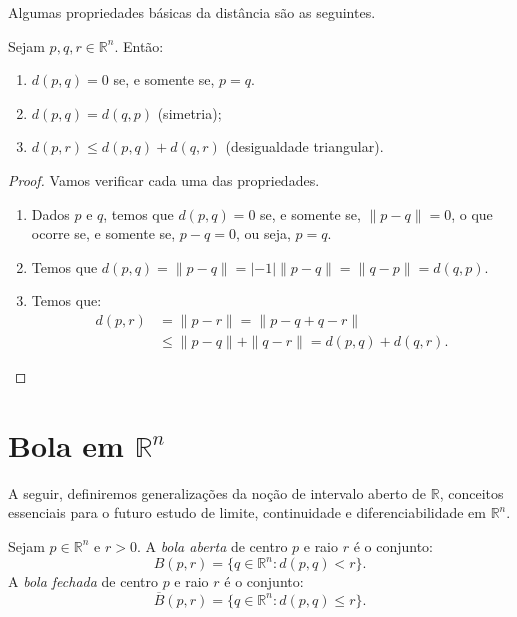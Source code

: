 Algumas propriedades básicas da distância são as seguintes.
\begin{proposition}
    Sejam $p, q, r \in \mathbb R^n$. Então:
    \begin{enumerate}
        \item $d(p, q) = 0$ se, e somente se, $p=q$.
        \item $d(p, q) = d(q, p)$ (simetria);
        \item $d(p, r) \leq d(p, q) + d(q, r)$ (desigualdade triangular).
    \end{enumerate}
\end{proposition}
\begin{proof}
    Vamos verificar cada uma das propriedades.
    \begin{enumerate}
        \item Dados $p$ e $q$, temos que $d(p, q) = 0$ se, e somente se, $\|p-q\|=0$, o que ocorre se, e somente se, $p-q=0$, ou seja, $p=q$.
        \item Temos que $d(p, q) = \|p-q\| = |-1|\|p-q\| = \|q-p\| = d(q, p)$.
        \item Temos que:
        \begin{align*}
            d(p, r) &= \|p-r\| = \|p-q+q-r\| \\
            &\leq \|p-q\| + \|q-r\| = d(p, q) + d(q, r).
        \end{align*}
    \end{enumerate}
\end{proof}

\section{Bola em $\mathbb R^n$}
A seguir, definiremos generalizações da noção de intervalo aberto de $\mathbb R$, conceitos essenciais para o futuro estudo de limite, continuidade e diferenciabilidade em $\mathbb R^n$.

\begin{definition}
    Sejam $p \in \mathbb R^n$ e $r>0$. A \emph{bola aberta} de centro $p$ e raio $r$ é o conjunto:
    \begin{equation*}
        B(p, r) = \{q \in \mathbb R^n : d(p, q) < r\}.
    \end{equation*}
    A \emph{bola fechada} de centro $p$ e raio $r$ é o conjunto:
    \begin{equation*}
        \overline B(p, r) = \{q \in \mathbb R^n : d(p, q) \leq r\}.
    \end{equation*}
\end{definition}

